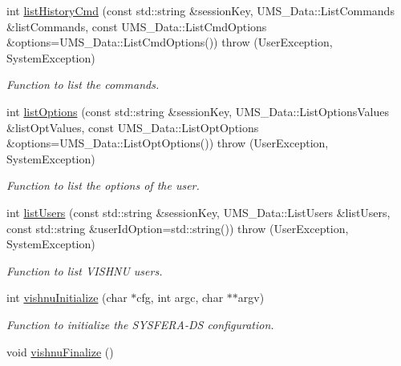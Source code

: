 \begin{DoxyCompactItemize}
int \hyperlink{namespacevishnu_a8576a50af31abe3869a61bec780aa5ef}{listHistoryCmd} (const std::string \&sessionKey, UMS\_\-Data::ListCommands \&listCommands, const UMS\_\-Data::ListCmdOptions \&options=UMS\_\-Data::ListCmdOptions())  throw (UserException, SystemException)
\begin{DoxyCompactList}\small\item\em Function to list the commands. \item\end{DoxyCompactList}\item 
int \hyperlink{namespacevishnu_a53106e021a6e98049b41106c12356e28}{listOptions} (const std::string \&sessionKey, UMS\_\-Data::ListOptionsValues \&listOptValues, const UMS\_\-Data::ListOptOptions \&options=UMS\_\-Data::ListOptOptions())  throw (UserException, SystemException)
\begin{DoxyCompactList}\small\item\em Function to list the options of the user. \item\end{DoxyCompactList}\item 
int \hyperlink{namespacevishnu_a6a0175686b0d2aff434015fc61c62ce6}{listUsers} (const std::string \&sessionKey, UMS\_\-Data::ListUsers \&listUsers, const std::string \&userIdOption=std::string())  throw (UserException, SystemException)
\begin{DoxyCompactList}\small\item\em Function to list VISHNU users. \item\end{DoxyCompactList}\item 
int \hyperlink{namespacevishnu_adc7892040980c12dd70ed3228f350313}{vishnuInitialize} (char $\ast$cfg, int argc, char $\ast$$\ast$argv)
\begin{DoxyCompactList}\small\item\em Function to initialize the SYSFERA-\/DS configuration. \item\end{DoxyCompactList}\item 
\hypertarget{namespacevishnu_a5ef439295f52f8055a0771ae9f257b68}{
void \hyperlink{namespacevishnu_a5ef439295f52f8055a0771ae9f257b68}{vishnuFinalize} ()}
\label{namespacevishnu_a5ef439295f52f8055a0771ae9f257b68}


\end{DoxyCompactItemize}
